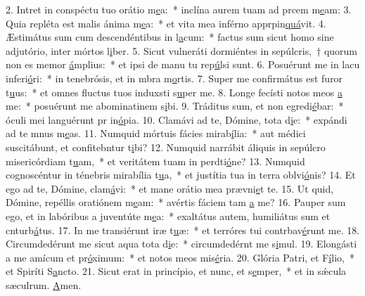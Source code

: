 2. Intret in conspéctu tuo orátio m\uline{e}a:~* inclína aurem tuam ad prcem m\uline{e}am:
3. Quia repléta est malis ánima m\uline{e}a:~* et vita mea inférno apprpin\uline{quá}vit.
4. Æstimátus sum cum descendéntibus in l\uline{a}cum:~* factus sum sicut homo sine adjutório, inter mórtos l\uline{i}ber.
5. Sicut vulneráti dormiéntes in sepúlcris,~† quorum non es memor \uline{á}mplius:~* et ipsi de manu tu rep\uline{ú}lsi sunt.
6. Posuérunt me in lacu inferi\uline{ó}ri:~* in tenebrósis, et in mbra m\uline{o}rtis.
7. Super me confirmátus est furor t\uline{u}us:~* et omnes fluctus tuos induxsti s\uline{u}per me.
8. Longe fecísti notos meos \uline{a} me:~* posuérunt me abominatinem s\uline{i}bi.
9. Tráditus sum, et non egredi\uline{é}bar:~* óculi mei languérunt pr in\uline{ó}pia.
10. Clamávi ad te, Dómine, tota d\uline{i}e:~* expándi ad te mnus m\uline{e}as.
11. Numquid mórtuis fácies mirab\uline{í}lia:~* aut médici suscitábunt, et confitebntur t\uline{i}bi?
12. Numquid narrábit áliquis in sepúlcro misericórdiam t\uline{u}am,~* et veritátem tuam in perdti\uline{ó}ne?
13. Numquid cognoscéntur in ténebris mirabília t\uline{u}a,~* et justítia tua in terra oblvi\uline{ó}nis?
14. Et ego ad te, Dómine, clam\uline{á}vi:~* et mane orátio mea prævni\uline{e}t te.
15. Ut quid, Dómine, repéllis oratiónem m\uline{e}am:~* avértis fáciem tam \uline{a} me?
16. Pauper sum ego, et in labóribus a juventúte m\uline{e}a:~* exaltátus autem, humiliátus sum et cnturb\uline{á}tus.
17. In me transiérunt iræ t\uline{u}æ:~* et terróres tui contrbav\uline{é}runt me.
18. Circumdedérunt me sicut aqua tota d\uline{i}e:~* circumdedérnt me s\uline{i}mul.
19. Elongásti a me amícum et pr\uline{ó}ximum:~* et notos meos  mis\uline{é}ria.
20. Glória Patri, et F\uline{í}lio,~* et Spiríti S\uline{a}ncto.
21. Sicut erat in princípio, et nunc, et s\uline{e}mper,~* et in sǽcula sæculrum. \uline{A}men.
